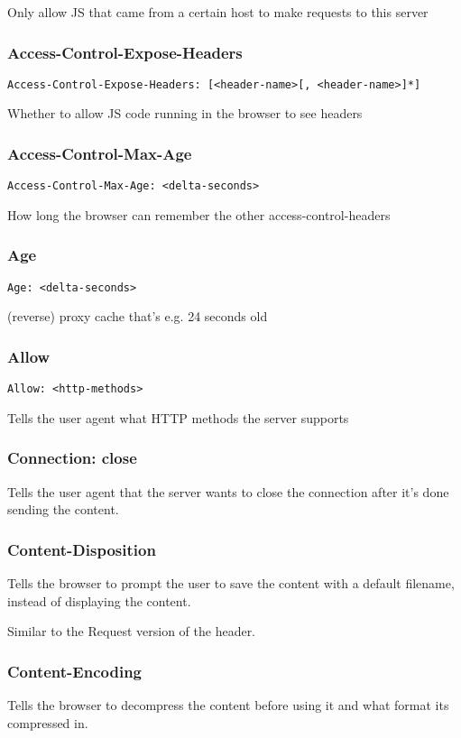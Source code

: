 \documentclass[../CMPUT-404-Notes.tex]{subfiles}
\begin{document}
Only allow JS that came from a certain host to make requests to this server


\subsubsection{Access-Control-Expose-Headers}
\texttt{Access-Control-Expose-Headers: [<header-name>[, <header-name>]*]}

Whether to allow JS code running in the browser to see headers

\subsubsection{Access-Control-Max-Age}
\texttt{Access-Control-Max-Age: <delta-seconds>}

How long the browser can remember the other access-control-headers

\subsubsection{Age}
\texttt{Age: <delta-seconds>}

(reverse) proxy cache that's e.g. 24 seconds old

\subsubsection{Allow}
\texttt{Allow: <http-methods>}

Tells the user agent what HTTP methods the server supports

\subsubsection{Connection: close}
Tells the user agent that the server wants to close the connection after it's done sending the content.

\subsubsection{Content-Disposition}
Tells the browser to prompt the user to save the content with a default filename, instead of displaying the content.

Similar to the Request version of the header.

\subsubsection{Content-Encoding}
Tells the browser to decompress the content before using it and what format its compressed in. 
\end{document}
